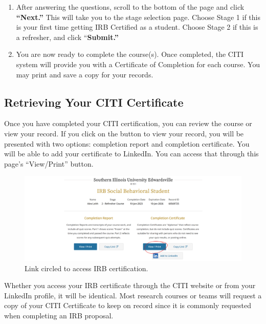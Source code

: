 \documentclass[
]{book}
\begin{document}
\begin{enumerate}
\def\labelenumi{\arabic{enumi}.}
\setcounter{enumi}{3}
\item
  After answering the questions, scroll to the bottom of the page and click \textbf{``Next.''} This will take you to the stage selection page. Choose Stage 1 if this is your first time getting IRB Certified as a student. Choose Stage 2 if this is a refresher, and click ``\textbf{Submit.''}
\item
  You are now ready to complete the course(s). Once completed, the CITI system will provide you with a Certificate of Completion for each course. You may print and save a copy for your records.
\end{enumerate}

\subsection*{Retrieving Your CITI Certificate}\label{retrieving-your-citi-certificate}

Once you have completed your CITI certification, you can review the course or view your record. If you click on the button to view your record, you will be presented with two options: completion report and completion certificate. You will be able to add your certificate to LinkedIn. You can access that through this page's ``View/Print'' button.

\begin{figure}
\centering
\includegraphics[width=1\linewidth,height=\textheight,keepaspectratio]{images/citi-cert-link.png}
\caption{Link circled to access IRB certification.}
\end{figure}

Whether you access your IRB certificate through the CITI website or from your LinkedIn profile, it will be identical. Most research courses or teams will request a copy of your CITI Certificate to keep on record since it is commonly requested when completing an IRB proposal.
\end{document}

